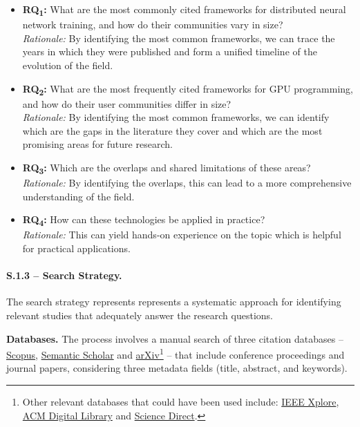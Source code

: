 \label{sec:research_questions_refined}
\begin{itemize}
	\item \textbf{RQ\textsubscript{1}:} What are the most commonly cited
	      frameworks for distributed neural network training, and how do their communities vary in size? \\
	      \textit{Rationale:} By identifying the most common frameworks, we can trace the years in which they were published
	      and form a unified timeline of the evolution of the field.

	\item \textbf{RQ\textsubscript{2}:} What are the most frequently cited
	      frameworks for GPU programming, and how do their user communities differ in size?\\
	      \textit{Rationale:} By identifying the most common frameworks, we can identify which are the gaps
	      in the literature they cover and which are the most promising areas for future research.

	\item \textbf{RQ\textsubscript{3}:} Which are the overlaps and shared limitations of these areas? \\
	      \textit{Rationale:} By identifying the overlaps, this can lead to a more comprehensive understanding of the field.

	\item \textbf{RQ\textsubscript{4}:} How can these technologies be applied in practice? \\
	      \textit{Rationale:} This can yield hands-on experience on the topic which is helpful for practical applications.

\end{itemize}

\paragraph{S.1.3 -- Search Strategy.}
The search strategy represents represents a systematic approach for identifying relevant studies
that adequately answer the research questions.

\textbf{Databases.}
The process involves a manual search of three citation databases --
\href{https://www.scopus.com/}{Scopus}, \href{https://www.semanticscholar.org/}{Semantic Scholar}
and \href{https://arxiv.org/}{arXiv}\footnote{Other relevant databases that could have been used
	include: \href{https://ieeexplore.ieee.org/}{IEEE Xplore}, \href{https://dl.acm.org/}{ACM Digital
		Library} and \href{https://www.sciencedirect.com/}{Science Direct}.} -- that include conference
proceedings and journal papers, considering three metadata fields (title, abstract, and keywords).

